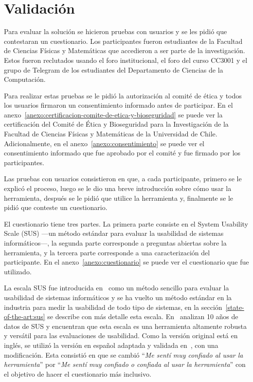 \chapter{Validación}

Para evaluar la solución se hicieron pruebas con usuarios y se les pidió que contestaran un cuestionario. Los participantes fueron estudiantes de la Facultad de Ciencias Físicas y Matemáticas que accedieron a ser parte de la investigación. Estos fueron reclutados usando el foro institucional, el foro del curso CC3001 y el grupo de Telegram de los estudiantes del Departamento de Ciencias de la Computación.

Para realizar estas pruebas se le pidió la autorización al comité de ética y todos los usuarios firmaron un consentimiento informado antes de participar. En el anexo~\ref{anexo:certificacion-comite-de-etica-y-bioseguridad} se puede ver la certificación del Comité de Ética y Bioseguridad para la Investigación de la Facultad de Ciencias Físicas y Matemáticas de la Universidad de Chile. Adicionalmente, en el anexo~\ref{anexo:consentimiento} se puede ver el consentimiento informado que fue aprobado por el comité y fue firmado por los participantes.

Las pruebas con usuarios consistieron en que, a cada participante, primero se le explicó el proceso, luego se le dio una breve introducción sobre cómo usar la herramienta, después se le pidió que utilice la herramienta y, finalmente se le pidió que conteste un cuestionario.

El cuestionario tiene tres partes. La primera parte consiste en el System Usability Scale (SUS) ---un método estándar para evaluar la usabilidad de sistemas informáticos---, la segunda parte corresponde a preguntas abiertas sobre la herramienta, y la tercera parte corresponde a una caracterización del participante. En el anexo~\ref{anexo:cuestionario} se puede ver el cuestionario que fue utilizado.

La escala SUS fue introducida en~\cite{brooke1996quick} como un método sencillo para evaluar la usabilidad de sistemas informáticos y se ha vuelto un método estándar en la industria para medir la usabilidad de todo tipo de sistemas, en la sección~\ref{state-of-the-art:sus} se describe con más detalle esta escala. En~\cite{evaluation-of-sus} analizan 10 años de datos de SUS y encuentran que esta escala es una herramienta altamente robusta y versátil para las evaluaciones de usabilidad. Como la versión original está en inglés, se utilizó la versión en español adaptada y validada en~\cite{spanish-sus}, con una modificación. Esta consistió en que se cambió ``\textit{Me sentí muy confiado al usar la herramienta}'' por ``\textit{Me sentí muy confiado o confiada al usar la herramienta}'' con el objetivo de hacer el cuestionario más inclusivo.

